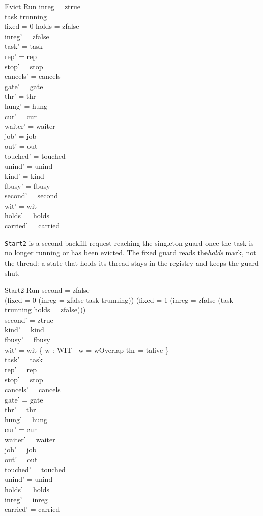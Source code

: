 \documentclass[a4paper,10pt,fleqn]{article}
\newcommand{\field}[1]{\texttt{#1}}
\begin{document}
\begin{schema}{Evict}
\Delta Run
\where
inreg = ztrue \\
task \neq trunning \\
fixed = 0 \lor holds = zfalse \\
inreg' = zfalse \\
task' = task \\
rep' = rep \\
stop' = stop \\
cancels' = cancels \\
gate' = gate \\
thr' = thr \\
hung' = hung \\
cur' = cur \\
waiter' = waiter \\
job' = job \\
out' = out \\
touched' = touched \\
unind' = unind \\
kind' = kind \\
fbusy' = fbusy \\
second' = second \\
wit' = wit \\
holds' = holds \\
carried' = carried
\end{schema}

\field{Start2} is a second backfill request reaching the singleton guard once
the task is no longer running or has been evicted. The fixed guard reads the\emph{holds} mark, not the thread: a state that holds its thread stays in the
registry and keeps the guard shut.

\begin{schema}{Start2}
\Delta Run
\where
second = zfalse \\
(fixed = 0 \land (inreg = zfalse \lor task \neq trunning)) \lor
  (fixed = 1 \land (inreg = zfalse \lor (task \neq trunning \land holds = zfalse))) \\
second' = ztrue \\
kind' = kind \\
fbusy' = fbusy \\
wit' = wit \cup \{ w : WIT | w = wOverlap \land thr = talive \} \\
task' = task \\
rep' = rep \\
stop' = stop \\
cancels' = cancels \\
gate' = gate \\
thr' = thr \\
hung' = hung \\
cur' = cur \\
waiter' = waiter \\
job' = job \\
out' = out \\
touched' = touched \\
unind' = unind \\
holds' = holds \\
inreg' = inreg \\
carried' = carried
\end{schema}
\end{document}
